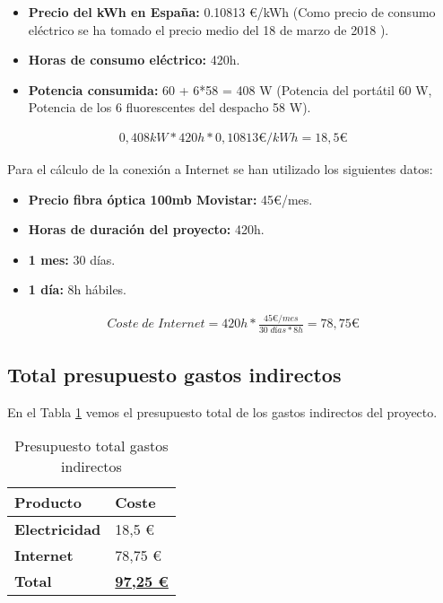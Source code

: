 \begin{itemize}
	\item \textbf{Precio del kWh en España:} 0.10813 €/kWh (Como precio de consumo eléctrico se ha tomado el precio medio del 18 de marzo de 2018 \cite{Tfg:luz} ).
	\item \textbf{Horas de consumo eléctrico:} 420h.
	\item \textbf{Potencia consumida:} 60 + 6*58 = 408 W (Potencia del portátil 60 W, Potencia de los 6 fluorescentes del despacho 58 W).
\end{itemize}

\label{eq:gastoelec}
\begin{align*}
0,408 kW * 420 h * 0,10813 \text{€}/kWh = 18,5 \text{€}
\end{align*}

Para el cálculo de la conexión a Internet se han utilizado los siguientes datos:

\begin{itemize}
	\item \textbf{Precio fibra óptica 100mb Movistar:} 45€/mes.
	\item \textbf{Horas de duración del proyecto:} 420h.
	\item \textbf{1 mes:} 30 días.
	\item \textbf{1 día:} 8h hábiles.
\end{itemize}

\label{eq:costeint}
\begin{align*}
Coste \; de \; Internet = 420h * \frac{45 \text{€}/mes}{30 \; días*8h} = 78,75 \text{€}
\end{align*}

\subsection{Total presupuesto gastos indirectos}

En el Tabla \ref{tab:prepgastosindi} vemos el presupuesto total de los gastos indirectos del proyecto.

\begin{table}[H]\label{tab:prepgastosindi}
	\centering
	\begin{tabular}{|l|l|}
		\hline
		\textbf{Producto}     & \textbf{Coste}                \\ \hline
		\textbf{Electricidad} & 18,5 €                        \\ \hline
		\textbf{Internet}     & 78,75 €                       \\ \hline
		\textbf{Total}        & \textbf{\underline{97,25 €}} \\ \hline
	\end{tabular}
	\caption{Presupuesto total gastos indirectos}
\end{table}

